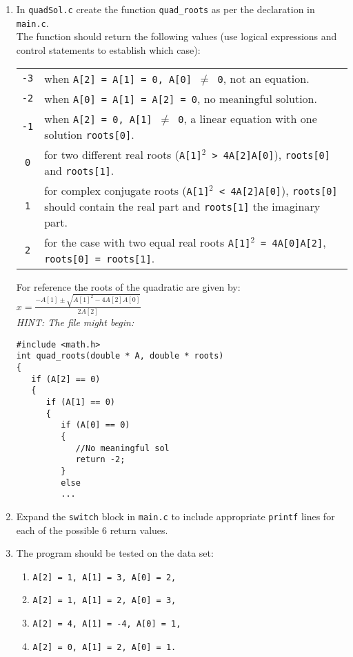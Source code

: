 \documentclass[a4paper,12pt]{article}
\begin{document}
\begin{enumerate}
\begin{enumerate}
\begin{scriptsize}
\begin{verbatim}
   switch(quad_roots(A, roots))
   {
   case 0:
      printf("x = %f\nx = %f\n",roots[0], roots[1]);
      break;
   }
   return 0;
}
\end{verbatim}
\end{scriptsize}
\item In \texttt{quadSol.c} create the function \texttt{quad\_roots} as per the declaration in \texttt{main.c}.\\
The function should return the following values (use logical expressions and control statements to establish which case):
\begin{center}
\begin{tabular}{c p{414pt}}
\tt -3& when {\tt A[2] = A[1] = 0, A[0] $\neq$ 0}, not an equation.\\
\tt -2& when {\tt A[0] = A[1] = A[2] = 0}, no meaningful solution.\\
\tt -1& when {\tt A[2] = 0, A[1] $\neq$ 0}, a linear equation with one solution {\tt roots[0]}.\\
\tt 0& for two different real roots ({\tt A[1]$^2$ > 4A[2]A[0]}), {\tt roots[0]} and {\tt roots[1]}.\\
\tt 1& for complex conjugate roots ({\tt A[1]$^2$ < 4A[2]A[0]}), {\tt roots[0]} should contain the real part and {\tt roots[1]} the imaginary part.\\
\tt 2& for the case with two equal real roots {\tt A[1]$^2$ = 4A[0]A[2]}, {\tt roots[0] = roots[1]}.
\end{tabular}
\end{center}
For reference the roots of the quadratic are given by:
$x=\frac{-A[1] \pm \sqrt {A[1]^2-4A[2]A[0]}}{2A[2]}$\\
\textit{HINT: The file might begin:}
\begin{scriptsize}
\begin{verbatim}
#include <math.h>
int quad_roots(double * A, double * roots)
{
   if (A[2] == 0)
   {
      if (A[1] == 0)
      {
         if (A[0] == 0)
         {
            //No meaningful sol
            return -2;
         }
         else
         ...
\end{verbatim}
\end{scriptsize}
\item Expand the \texttt{switch} block in \texttt{main.c} to include appropriate \texttt{printf} lines for each of the possible 6 return values.
\item The program should be tested on the data set:
\begin{multicols}{2}
\begin{enumerate}
\item \tt A[2] = 1, A[1] = 3, A[0] = 2,
\item \tt A[2] = 1, A[1] = 2, A[0] = 3,
\item \tt A[2] = 4, A[1] = -4, A[0] = 1,
\item \tt A[2] = 0, A[1] = 2, A[0] = 1.
\end{enumerate}
\end{multicols}
\end{enumerate}
\newpage


\end{enumerate}
\end{document}
